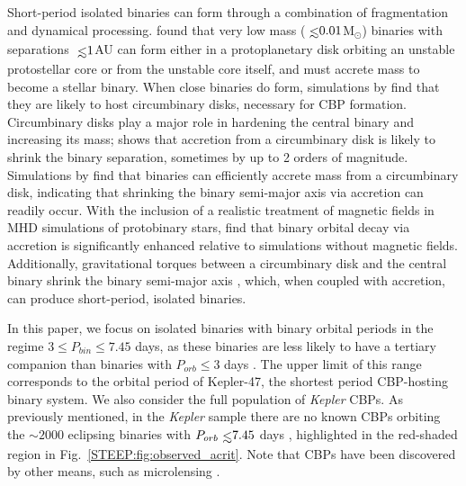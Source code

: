 Short-period isolated binaries can form through a combination of fragmentation and dynamical processing. \citet{Bonnell1994} found that very low mass ($\lsim 0.01$M$_{\odot}$) binaries with separations $\lsim 1$AU can form either in a protoplanetary disk orbiting an unstable protostellar core or from the unstable core itself, and must accrete mass to become a stellar binary.  When close binaries do form, simulations by \citet{Bate2000} find that they are likely to host circumbinary disks, necessary for CBP formation.  Circumbinary disks play a major role in hardening the central binary and increasing its mass; \citet{Bate2000} shows that accretion from a circumbinary disk is likely to shrink the binary separation, sometimes by up to 2 orders of magnitude.  Simulations by \citet{Arty1996} find that binaries can efficiently accrete mass from a circumbinary disk, indicating that shrinking the binary semi-major axis via accretion can readily occur.  With the inclusion of a realistic treatment of magnetic fields in MHD simulations of protobinary stars, \citet{Zhao2013} find that binary orbital decay via accretion is significantly enhanced relative to simulations without magnetic fields.  Additionally, gravitational torques between a circumbinary disk and the central binary shrink the binary semi-major axis \citep[e.g.][]{Arty1991,Bate2002,Armitage2005,Fleming2017}, which, when coupled with accretion, can produce short-period, isolated binaries.

In this paper, we focus on isolated binaries with binary orbital periods in the regime $3 \leq P_{bin} \leq 7.45 $ days, as these binaries are less likely to have a tertiary companion than binaries with $P_{orb} \leq 3$ days \citep{Tokovinin2006}.  The upper limit of this range corresponds to the orbital period of Kepler-47, the shortest period CBP-hosting binary system.  We also consider the full population of \textit{Kepler} CBPs.  As previously mentioned, in the {\it Kepler} sample there are no known CBPs orbiting the ${\sim 2000}$ eclipsing binaries with $P_{orb} \lsim 7.45$ days \citep{Kirk2016}, highlighted in the red-shaded region in Fig.~\ref{STEEP:fig:observed_acrit}.  Note that CBPs have been discovered by other means, such as microlensing \citep[e.g.][]{Bennett2016}. 


